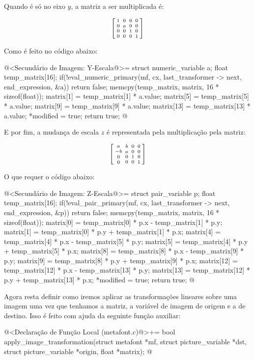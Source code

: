 {Quando é só no eixo $y$, a matriz a ser multiplicada é:

$$\left[{{1 \atop 0}\atop {0\atop
      0}}{{0 \atop a}\atop {0 \atop 0}}{{0\atop 0}\atop{1 \atop
      0}}{{0 \atop 0}\atop{0\atop 1}}\right]
$$

Como é feito no código abaixo:

\iniciocodigo
@<Secundário de Imagem: Y-Escala@>=
struct numeric_variable a;
float temp_matrix[16];
if(!eval_numeric_primary(mf, cx, last_transformer -> next, end_expression, &a))
  return false;
memcpy(temp_matrix, matrix, 16 * sizeof(float));
matrix[1] = temp_matrix[1] * a.value;
matrix[5] = temp_matrix[5] * a.value;
matrix[9] = temp_matrix[9] * a.value;
matrix[13] = temp_matrix[13] * a.value;
*modified = true;
return true;
@
\fimcodigo

E por fim, a mudança de escala $z$ é representada pela multiplicação
pela matriz:

$$\left[{{a \atop -b}\atop {0\atop
      0}}{{b \atop a}\atop {0 \atop 0}}{{0\atop 0}\atop{1 \atop
      0}}{{0 \atop 0}\atop{0\atop 1}}\right]
$$

O que requer o código abaixo:

\iniciocodigo
@<Secundário de Imagem: Z-Escala@>=
struct pair_variable p;
float temp_matrix[16];
if(!eval_pair_primary(mf, cx, last_transformer -> next, end_expression, &p))
  return false;
memcpy(temp_matrix, matrix, 16 * sizeof(float));
matrix[0] = temp_matrix[0] * p.x - temp_matrix[1] * p.y;
matrix[1] = temp_matrix[0] * p.y + temp_matrix[1] * p.x;
matrix[4] = temp_matrix[4] * p.x - temp_matrix[5] * p.y;
matrix[5] = temp_matrix[4] * p.y + temp_matrix[5] * p.x;
matrix[8] = temp_matrix[8] * p.x - temp_matrix[9] * p.y;
matrix[9] = temp_matrix[8] * p.y + temp_matrix[9] * p.x;
matrix[12] = temp_matrix[12] * p.x - temp_matrix[13] * p.y;
matrix[13] = temp_matrix[12] * p.y + temp_matrix[13] * p.x;
*modified = true;
return true;
@
\fimcodigo

Agora resta definir como iremos aplicar as transformações lineares
sobre uma imagem uma vez que tenhamos a matriz, a variável de imagem
de origem e a de destino. Isso é feito com ajuda da seguinte função
auxiliar:

\iniciocodigo
@<Declaração de Função Local (metafont.c)@>+=
bool apply_image_transformation(struct metafont *mf,
                                struct picture_variable *dst,
                                struct picture_variable *origin,
                                float *matrix);
@
\fimcodigo

}
